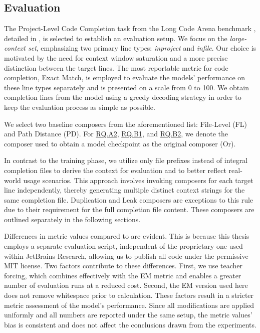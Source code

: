 \subsection{Evaluation}\label{sec:evaluation}

The Project-Level Code Completion task from the Long Code Arena benchmark \parencite{bogomolov2024}, detailed in , is selected to establish an evaluation setup. We focus on the \textit{large-context set}, emphasizing two primary line types: \textit{inproject} and \textit{infile}. Our choice is motivated by the need for context window saturation and a more precise distinction between the target lines. The most reportable metric for code completion, Exact Match, is employed to evaluate the models' performance on these line types separately and is presented on a scale from 0 to 100. We obtain completion lines from the model using a greedy decoding strategy in order to keep the evaluation process as simple as possible.

We select two baseline composers from the aforementioned list: File-Level (FL) and Path Distance (PD). For \hyperref[rq:rq-a2]{RQ.A2}, \hyperref[rq:rq-b1]{RQ.B1}, and \hyperref[rq:rq-b2]{RQ.B2}, we denote the composer used to obtain a model checkpoint as the original composer (Or).

In contrast to the training phase, we utilize only file prefixes instead of integral completion files to derive the context for evaluation and to better reflect real-world usage scenarios. This approach involves invoking composers for each target line independently, thereby generating multiple distinct context strings for the same completion file. Duplication and Leak composers are exceptions to this rule due to their requirement for the full completion file content. These composers are outlined separately in the following sections.

Differences in metric values compared to \citet{sapronov2025} are evident. This is because this thesis employs a separate evaluation script, independent of the proprietary one used within JetBrains Research, allowing us to publish all code under the permissive MIT license. Two factors contribute to these differences. First, we use teacher forcing, which combines effectively with the EM metric and enables a greater number of evaluation runs at a reduced cost. Second, the EM version used here does not remove whitespace prior to calculation. These factors result in a stricter metric assessment of the model's performance. Since all modifications are applied uniformly and all numbers are reported under the same setup, the metric values' bias is consistent and does not affect the conclusions drawn from the experiments.

